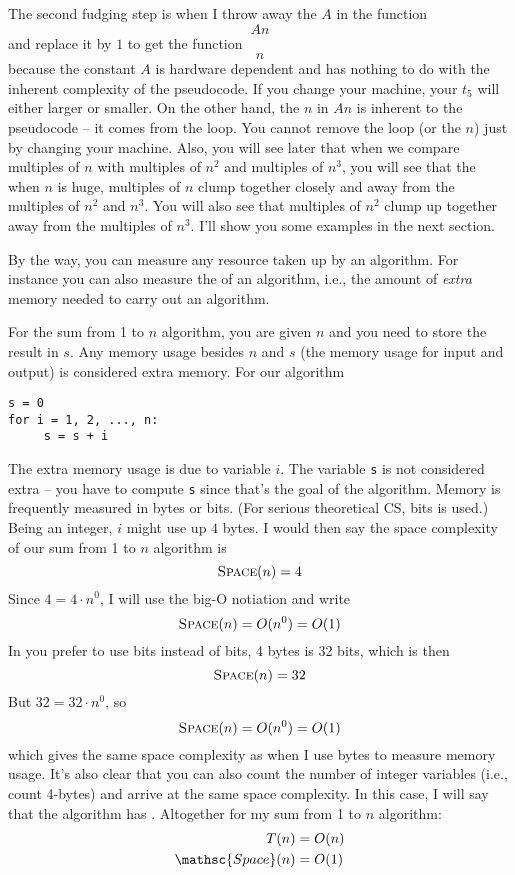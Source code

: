 The second fudging step is when I throw away the $A$ 
in the function
\[
An
\]
and replace it by $1$ to get the function
\[
n
\]
because
the constant $A$ is hardware dependent
and has nothing to do with the inherent complexity of the
pseudocode.
If you change your machine, your $t_5$ will either larger or smaller.
On the other hand, the $n$ in $An$ is inherent to the pseudocode -- it comes
from the loop.
You cannot remove the loop (or the $n$) just by changing your machine.
%
%
%
Also,
you will see later that when we compare multiples of $n$ with
multiples of $n^2$ and multiples of $n^3$, you will see that the
when $n$ is huge,
multiples of $n$ clump together closely and away from the multiples of
$n^2$ and $n^3$.
You will also see that multiples of $n^2$ clump up together away from the 
multiples of $n^3$.
I'll show you some examples in the next section.

By the way, you can measure any resource taken up by an algorithm.
For instance you can also measure the  of an
algorithm, i.e., the amount of \textit{extra} memory needed to carry out 
an algorithm.

For the sum from 1 to $n$ algorithm, you are given $n$
and you need to store the result in $s$.
Any memory usage besides $n$ and $s$ (the memory
usage for input and output) is considered extra memory.
For our algorithm
\begin{Verbatim}[frame=single, fontsize=\footnotesize]
s = 0
for i = 1, 2, ..., n:
     s = s + i
\end{Verbatim}
The extra memory usage is due to variable $i$.
The variable \verb!s! is not considered extra -- you have to compute
\verb!s! since that's the goal of the algorithm.
Memory is frequently measured in bytes or bits.
(For serious theoretical CS, bits is used.)
Being an integer, $i$ might use up $4$ bytes.
I would then say the space complexity of our sum from 1 to $n$ algorithm is
\[
\textsc{Space}(n) = 4
\]
Since $4 = 4 \cdot n^0$, I will use the big-O notiation and write
\[
\textsc{Space}(n) = O(n^0) = O(1)
\]
In you prefer to use bits instead of bits, 4 bytes is 32 bits, which is then
\[
\textsc{Space}(n) = 32
\]
But $32 = 32 \cdot n^0$, so
\[
\textsc{Space}(n) = O(n^0) = O(1)
\]
which gives the same space complexity as when I use bytes to measure
memory usage.
It's also clear that you can also count the number of integer variables
(i.e., count 4-bytes) and arrive at the same space complexity.
In this case, I will say that the algorithm has
.
Altogether for my sum from 1 to $n$ algorithm:
\begin{align*}
  T(n) &= O(n) \\
  \mathsc{Space}(n) &= O(1)
\end{align*}
  
